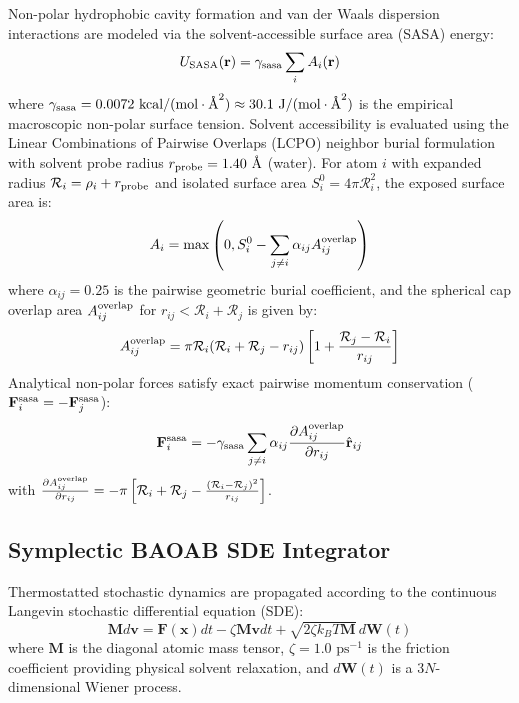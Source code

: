 \documentclass[journal=jpcbfk,manuscript=article,layout=twocolumn]{achemso}
\begin{document}
Non-polar hydrophobic cavity formation and van der Waals dispersion interactions are modeled via the solvent-accessible surface area (SASA) energy:\cite{weiser1999approximate}
\begin{equation}
U_{\rm SASA}(\mathbf{r}) = \gamma_{\rm sasa} \sum_i A_i(\mathbf{r})
\end{equation}
where $\gamma_{\rm sasa} = 0.0072\text{ kcal}/(\text{mol}\cdot\text{\AA}^2) \approx 30.1\text{ J}/(\text{mol}\cdot\text{\AA}^2)$ is the empirical macroscopic non-polar surface tension. Solvent accessibility is evaluated using the Linear Combinations of Pairwise Overlaps (LCPO) neighbor burial formulation with solvent probe radius $r_{\rm probe} = 1.40\text{ \AA}$ (water). For atom $i$ with expanded radius $\mathcal{R}_i = \rho_i + r_{\rm probe}$ and isolated surface area $S_i^0 = 4\pi \mathcal{R}_i^2$, the exposed surface area is:
\begin{equation}
A_i = \max\left( 0, S_i^0 - \sum_{j \neq i} \alpha_{ij} A_{ij}^{\rm overlap} \right)
\end{equation}
where $\alpha_{ij} = 0.25$ is the pairwise geometric burial coefficient, and the spherical cap overlap area $A_{ij}^{\rm overlap}$ for $r_{ij} < \mathcal{R}_i + \mathcal{R}_j$ is given by:
\begin{equation}
A_{ij}^{\rm overlap} = \pi \mathcal{R}_i (\mathcal{R}_i + \mathcal{R}_j - r_{ij}) \left[ 1 + \frac{\mathcal{R}_j - \mathcal{R}_i}{r_{ij}} \right]
\end{equation}
Analytical non-polar forces satisfy exact pairwise momentum conservation ($\mathbf{F}_i^{\rm sasa} = - \mathbf{F}_j^{\rm sasa}$):
\begin{equation}
\mathbf{F}_i^{\rm sasa} = - \gamma_{\rm sasa} \sum_{j \neq i} \alpha_{ij} \frac{\partial A_{ij}^{\rm overlap}}{\partial r_{ij}} \hat{\mathbf{r}}_{ij}
\end{equation}
with $\frac{\partial A_{ij}^{\rm overlap}}{\partial r_{ij}} = - \pi \left[ \mathcal{R}_i + \mathcal{R}_j - \frac{(\mathcal{R}_i - \mathcal{R}_j)^2}{r_{ij}} \right]$.

\subsection{Symplectic BAOAB SDE Integrator}
Thermostatted stochastic dynamics are propagated according to the continuous Langevin stochastic differential equation (SDE):
\begin{equation}
\mathbf{M} d\mathbf{v} = \mathbf{F}(\mathbf{x}) dt - \zeta \mathbf{M} \mathbf{v} dt + \sqrt{2 \zeta k_B T \mathbf{M}} \, d\mathbf{W}(t)
\end{equation}
where $\mathbf{M}$ is the diagonal atomic mass tensor, $\zeta = 1.0\text{ ps}^{-1}$ is the friction coefficient providing physical solvent relaxation, and $d\mathbf{W}(t)$ is a $3N$-dimensional Wiener process. 
\end{document}
